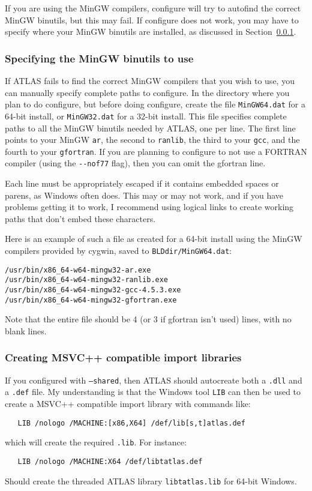 \documentclass[11pt]{article}
\begin{document}
If you are using the MinGW compilers, configure will try to autofind the
correct MinGW binutils, but this may fail.  If configure does not work,
you may have to specify where your MinGW binutils are installed, as discussed
in Section~\ref{sec-MinGWbin}.


\subsubsection{Specifying the MinGW binutils to use}
\label{sec-MinGWbin}
If ATLAS fails to find the correct MinGW compilers that you wish to use,
you can manually specify complete paths to configure.  In the directory
where you plan to do configure, but before doing configure, create the
file \verb+MinGW64.dat+ for a 64-bit install, or \verb+MinGW32.dat+ for
a 32-bit install.  This file specifies complete paths to all the MinGW
binutils needed by ATLAS, one per line.  The first line points to
your MinGW \verb+ar+, the second to \verb+ranlib+, the third to your \verb+gcc+,
and the fourth to your \verb+gfortran+.  If you are planning to configure
to not use a FORTRAN compiler (using the \verb+--nof77+ flag), then
you can omit the gfortran line.

Each line must be appropriately escaped if it contains embedded spaces or
parens, as Windows often does.  This may or may not work, and if you have
problems getting it to work, I recommend using logical links to create
working paths that don't embed these characters.

Here is an example of such a file as created for a 64-bit install using the
MinGW compilers provided by cygwin, saved to \verb+BLDdir/MinGW64.dat+:
\begin{verbatim}
/usr/bin/x86_64-w64-mingw32-ar.exe
/usr/bin/x86_64-w64-mingw32-ranlib.exe
/usr/bin/x86_64-w64-mingw32-gcc-4.5.3.exe
/usr/bin/x86_64-w64-mingw32-gfortran.exe
\end{verbatim}
Note that the entire file should be 4 (or 3 if gfortran isn't used) lines, 
with no blank lines.

\subsubsection{Creating MSVC++ compatible import libraries}
If you configured with \texttt{--shared}, then ATLAS should autocreate
both a \texttt{.dll} and a \texttt{.def} file.  My understanding is that
the Windows tool \texttt{LIB} can then be used to create a MSVC++ compatible
import library with commands like:
\begin{verbatim}
   LIB /nologo /MACHINE:[x86,X64] /def/lib[s,t]atlas.def
\end{verbatim}
which will create the required \texttt{.lib}.  For instance:
\begin{verbatim}
   LIB /nologo /MACHINE:X64 /def/libtatlas.def
\end{verbatim}
Should create the threaded ATLAS library \texttt{libtatlas.lib} for 64-bit
Windows.
\end{document}
